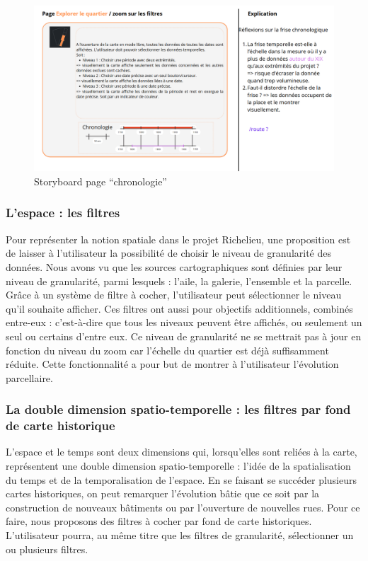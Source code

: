 \begin{figure}[h!]
    \centering
    \includegraphics[width=1\linewidth]{images/storyboard-chrono.png}
    \caption{Storyboard page \enquote{chronologie}}
    \label{fig:story-chrono}
\end{figure}

\subsubsection{L'espace : les filtres}
Pour représenter la notion spatiale dans le projet Richelieu, une proposition est de laisser à l'utilisateur la possibilité de choisir le niveau de granularité des données. Nous avons vu que les sources cartographiques sont définies par leur niveau de granularité, parmi lesquels : l'aile, la galerie, l'ensemble et la parcelle. Grâce à un système de filtre à cocher, l'utilisateur peut sélectionner le niveau qu'il souhaite afficher. Ces filtres ont aussi pour objectifs additionnels, combinés entre-eux : c'est-à-dire que tous les niveaux peuvent être affichés, ou seulement un seul ou certains d'entre eux. Ce niveau de granularité ne se mettrait pas à jour en fonction du niveau du zoom car l'échelle du quartier est déjà suffisamment réduite. Cette fonctionnalité a pour but de montrer à l'utilisateur l'évolution parcellaire.

\subsubsection{La double dimension spatio-temporelle : les filtres par fond de carte historique}

L'espace et le temps sont deux dimensions qui, lorsqu'elles sont reliées à la carte, représentent une double dimension spatio-temporelle : l'idée de la spatialisation du temps et de la temporalisation de l'espace. En se faisant se succéder plusieurs cartes historiques, on peut remarquer l'évolution bâtie que ce soit par la construction de nouveaux bâtiments ou par l'ouverture de nouvelles rues. Pour ce faire, nous proposons des filtres à cocher par fond de carte historiques. L'utilisateur pourra, au même titre que les filtres de granularité, sélectionner un ou plusieurs filtres. 


